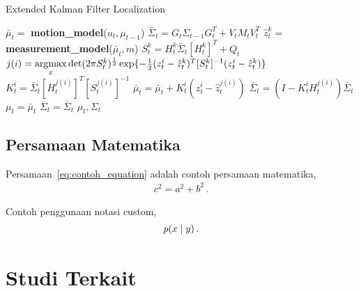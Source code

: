	\begin{algorithm}
		\caption{Extended Kalman Filter Localization}
		\label{algoritma:ekf}
		\begin{algorithmic}[1]
			\State $\bar{\mu}_t = $ \textbf{motion\_model}($u_t, \mu_{t-1}$)
			\State $\bar{\Sigma}_t = G_t \Sigma_{t-1} G_t^T + V_t M_t V_t^T$
			\State $\hat{z}_t^k = $ \textbf{measurement\_model}($\bar{\mu}_t, m$)
			\State $S_t^k = H_t^k \bar{\Sigma}_t [H_t^k]^T + Q_t$ 
			\EndFor
			\State $j(i) = \operatorname*{argmax}\limits_{x} \det(2 \pi S_t^k)^{\frac{1}{2}} \exp\{-\frac{1}{2} (z_t^i - \hat{z}_t^k)^T [S_t^k]^{-1} (z_t^i - \hat{z}_t^k)\}$
			\State $K_t^i = \bar{\Sigma}_t [H_t^{j(i)}]^T [S_t^{j(i)}]^{-1}$
			\State $\bar{\mu}_t = \bar{\mu}_t + K_t^i (z_t^i - \hat{z}_t^{j(i)})$
			\State $\bar{\Sigma}_t = (I - K_t^i H_t^{j(i)}) \bar{\Sigma}_t$
			\EndFor
			\State $\mu_t = \bar{\mu}_t$
			\State $\Sigma_t = \bar{\Sigma}_t$
			\State \Return $\mu_t, \Sigma_t$
			\EndFunction
		\end{algorithmic}
	\end{algorithm}	

    \subsection{Persamaan Matematika}

    \blindtext Persamaan~\eqref{eq:contoh_equation} adalah contoh persamaan matematika,
    \begin{align}
        c^2 = a^2 + b^2\,.
    \label{eq:contoh_equation}
    \end{align}
    
    Contoh penggunaan notasi custom,
    \begin{align}
        p(x \mid y)\,.
    \label{eq:contoh_equation_custom}
    \end{align}

\section{Studi Terkait}
\blindtext
